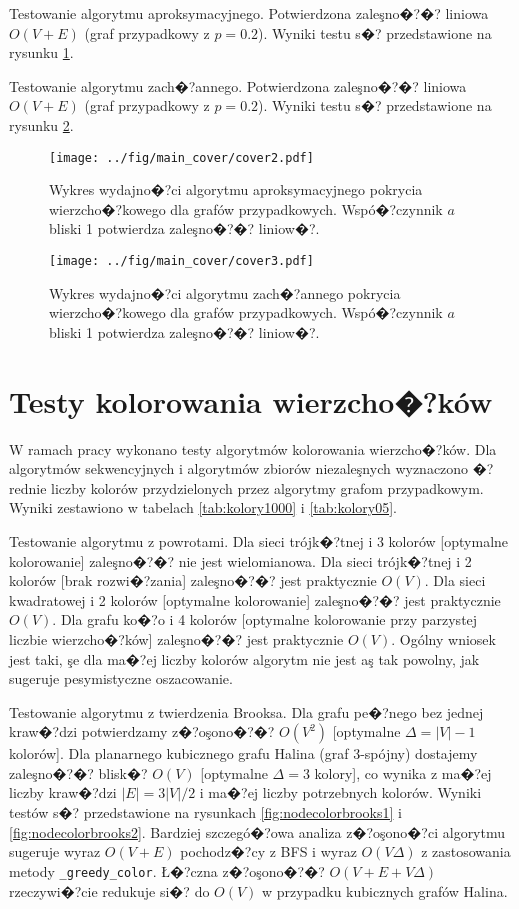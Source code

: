 \documentclass[12pt,a4paper]{mwrep}
\begin{document}
Testowanie algorytmu aproksymacyjnego.
Potwierdzona zaleşno�?�? liniowa $O(V+E)$ (graf przypadkowy z $p=0.2$).
Wyniki testu s�? przedstawione na rysunku \ref{fig:nodecoverapp}.

Testowanie algorytmu zach�?annego.
Potwierdzona zaleşno�?�? liniowa $O(V+E)$ (graf przypadkowy z $p=0.2$).
Wyniki testu s�? przedstawione na rysunku \ref{fig:nodecoverdeg}.

\begin{figure}
\centering
\texttt{[image: ../fig/main\_cover/cover2.pdf]}
\caption[Wydajno�?�? algorytmu aproksymacyjnego pokrycia wierzcho�?kowego.]{
\label{fig:nodecoverapp}
Wykres wydajno�?ci algorytmu aproksymacyjnego pokrycia wierzcho�?kowego
dla grafów przypadkowych.
Wspó�?czynnik $a$ bliski 1 potwierdza zaleşno�?�? liniow�?.}
\end{figure}

\begin{figure}
\centering
\texttt{[image: ../fig/main\_cover/cover3.pdf]}
\caption[Wydajno�?�? algorytmu zach�?anego pokrycia wierzcho�?kowego.]{
\label{fig:nodecoverdeg}
Wykres wydajno�?ci algorytmu zach�?annego pokrycia wierzcho�?kowego
dla grafów przypadkowych.
Wspó�?czynnik $a$ bliski 1 potwierdza zaleşno�?�? liniow�?.}
\end{figure}


\chapter{Testy kolorowania wierzcho�?ków}
\label{app:test_vertex_coloring}

W ramach pracy wykonano testy algorytmów kolorowania wierzcho�?ków.
Dla algorytmów sekwencyjnych i algorytmów zbiorów niezaleşnych
wyznaczono �?rednie liczby kolorów przydzielonych przez algorytmy
grafom przypadkowym. Wyniki zestawiono w tabelach
\ref{tab:kolory1000} i \ref{tab:kolory05}.

Testowanie algorytmu z powrotami.
Dla sieci trójk�?tnej i 3 kolorów [optymalne kolorowanie] zaleşno�?�? 
nie jest wielomianowa.
Dla sieci trójk�?tnej i 2 kolorów [brak rozwi�?zania] zaleşno�?�?
jest praktycznie $O(V)$.
Dla sieci kwadratowej i 2 kolorów [optymalne kolorowanie]
zaleşno�?�? jest praktycznie $O(V)$.
Dla grafu ko�?o i 4 kolorów [optymalne kolorowanie przy parzystej
liczbie wierzcho�?ków] zaleşno�?�? jest praktycznie $O(V)$.
Ogólny wniosek jest taki, şe dla ma�?ej liczby kolorów algorytm
nie jest aş tak powolny, jak sugeruje pesymistyczne oszacowanie.

Testowanie algorytmu z twierdzenia Brooksa.
Dla grafu pe�?nego bez jednej kraw�?dzi potwierdzamy z�?oşono�?�? $O(V^2)$
[optymalne $\Delta=|V|-1$ kolorów].
Dla planarnego kubicznego grafu Halina (graf 3-spójny)
dostajemy zaleşno�?�? blisk�? $O(V)$ [optymalne $\Delta=3$ kolory],
co wynika z ma�?ej liczby kraw�?dzi $|E|=3|V|/2$ 
i ma�?ej liczby potrzebnych kolorów.
Wyniki testów s�? przedstawione na rysunkach 
\ref{fig:nodecolorbrooks1} i
\ref{fig:nodecolorbrooks2}.
Bardziej szczegó�?owa analiza z�?oşono�?ci algorytmu sugeruje 
wyraz $O(V+E)$ pochodz�?cy z BFS i wyraz $O(V \Delta)$
z zastosowania metody \lstinline|_greedy_color|.
Ł�?czna z�?oşono�?�? $O(V + E + V \Delta)$ rzeczywi�?cie redukuje si�?
do $O(V)$ w przypadku kubicznych grafów Halina.
\end{document}
